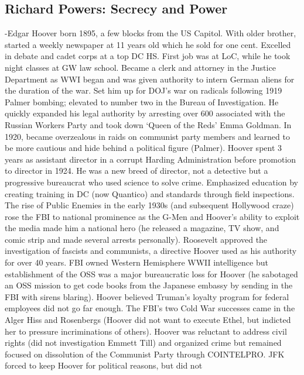 \documentclass[
]{article}
\begin{document}
\hypertarget{richard-powers-secrecy-and-power}{%
\subsection{Richard Powers: Secrecy and
Power}\label{richard-powers-secrecy-and-power}}

-Edgar Hoover born 1895, a few blocks from the US Capitol. With older
brother, started a weekly newspaper at 11 years old which he sold for
one cent. Excelled in debate and cadet corps at a top DC HS. First job
was at LoC, while he took night classes at GW law school. Became a clerk
and attorney in the Justice Department as WWI began and was given
authority to intern German aliens for the duration of the war. Set him
up for DOJ's war on radicals following 1919 Palmer bombing; elevated to
number two in the Bureau of Investigation. He quickly expanded his legal
authority by arresting over 600 associated with the Russian Workers
Party and took down `Queen of the Reds' Emma Goldman. In 1920, became
overzealous in raids on communist party members and learned to be more
cautious and hide behind a political figure (Palmer). Hoover spent 3
years as assistant director in a corrupt Harding Administration before
promotion to director in 1924. He was a new breed of director, not a
detective but a progressive bureaucrat who used science to solve crime.
Emphasized education by creating training in DC (now Quantico) and
standards through field inspections. The rise of Public Enemies in the
early 1930s (and subsequent Hollywood craze) rose the FBI to national
prominence as the G-Men and Hoover's ability to exploit the media made
him a national hero (he released a magazine, TV show, and comic strip
and made several arrests personally). Roosevelt approved the
investigation of fascists and communists, a directive Hoover used as his
authority for over 40 years. FBI owned Western Hemisphere WWII
intelligence but establishment of the OSS was a major bureaucratic loss
for Hoover (he sabotaged an OSS mission to get code books from the
Japanese embassy by sending in the FBI with sirens blaring). Hoover
believed Truman's loyalty program for federal employees did not go far
enough. The FBI's two Cold War successes came in the Alger Hiss and
Rosenbergs (Hoover did not want to execute Ethel, but indicted her to
pressure incriminations of others). Hoover was reluctant to address
civil rights (did not investigation Emmett Till) and organized crime but
remained focused on dissolution of the Communist Party through
COINTELPRO. JFK forced to keep Hoover for political reasons, but did not
\end{document}
